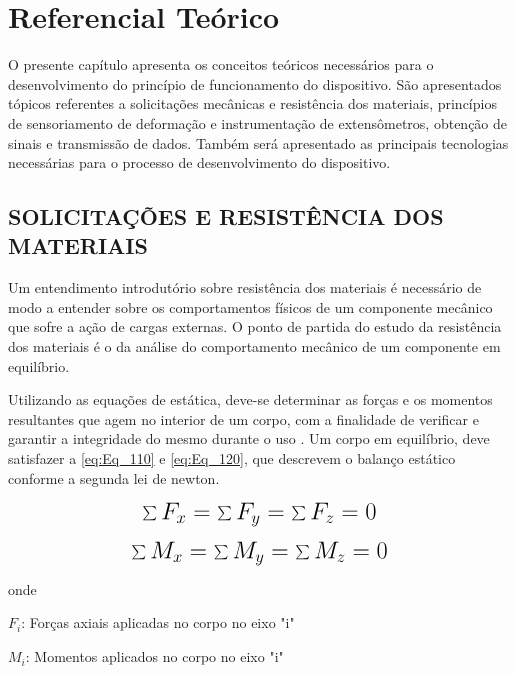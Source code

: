 
\chapter{Referencial Teórico}

O presente capítulo apresenta os conceitos teóricos necessários para o desenvolvimento do princípio de funcionamento do dispositivo.
São apresentados tópicos referentes a solicitações mecânicas e resistência dos materiais, princípios de sensoriamento de deformação e instrumentação de extensômetros,
obtenção de sinais e transmissão de dados. Também será apresentado as principais tecnologias necessárias para o processo de desenvolvimento do dispositivo.

\section{SOLICITAÇÕES E RESISTÊNCIA DOS MATERIAIS}

Um entendimento introdutório sobre resistência dos materiais é necessário de modo a entender sobre os comportamentos físicos de um componente mecânico
que sofre a ação de cargas externas. O ponto de partida do estudo da resistência dos materiais é o da análise do comportamento mecânico de um componente em equilíbrio.

Utilizando as equações de estática, deve-se determinar as forças e os momentos resultantes que agem no interior de um corpo, com a finalidade de verificar
e garantir a integridade do mesmo durante o uso \autocite{Hibbeler2010}. Um corpo em equilíbrio, deve satisfazer a \autoref{eq:Eq_110} e \autoref{eq:Eq_120}, que
descrevem o balanço estático conforme a segunda lei de newton.

\begin{equation}\label{eq:Eq_110}%
\mbox{\fontsize{17.28}{21.6}\selectfont\( %
\sum F_{x} = \sum F_{y} = \sum F_{z} = 0
\)} %
\end{equation}

\begin{equation}\label{eq:Eq_120}%
\mbox{\fontsize{17.28}{21.6}\selectfont\( %
\sum M_{x} = \sum M_{y} = \sum M_{z} = 0
\)} %
\end{equation}

onde

$F_{i}$: Forças axiais aplicadas no corpo no eixo "i"

$M_{i}$: Momentos aplicados no corpo no eixo "i"

\hfill

